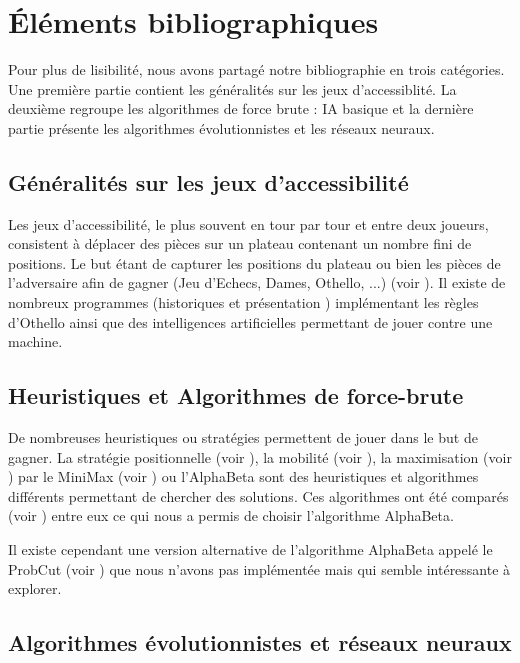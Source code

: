 \section{Éléments bibliographiques} 

\nocite{*}

Pour plus de lisibilité, nous avons partagé notre bibliographie en trois catégories. Une première partie contient les généralités sur les jeux d’accessiblité. La deuxième regroupe les algorithmes de force brute : IA basique et la dernière partie présente les algorithmes évolutionnistes et les réseaux neuraux.




\subsection{Généralités sur les jeux d'accessibilité}

Les jeux d’accessibilité, le plus souvent en tour par tour et entre deux
joueurs, consistent à déplacer des pièces sur un plateau contenant un
nombre fini de positions. Le but étant de capturer les positions du
plateau ou bien les pièces de l'adversaire afin de gagner (Jeu d’Echecs, Dames, Othello, ...) (voir \cite{7}). Il existe de nombreux programmes (historiques \cite{otstory} et présentation \cite{a}) implémentant les règles d'Othello ainsi que des intelligences artificielles permettant de jouer contre une machine.




\subsection{Heuristiques et Algorithmes de force-brute}

De nombreuses heuristiques ou stratégies permettent de jouer dans le but de gagner. La stratégie positionnelle (voir \cite{strategy}), la mobilité (voir \cite{13}), la maximisation (voir \cite{1}) par le MiniMax (voir \cite{2})  ou l'AlphaBeta sont des heuristiques et algorithmes différents permettant de chercher des solutions. Ces algorithmes ont été comparés (voir \cite{11}) entre eux ce qui nous a permis de choisir l'algorithme AlphaBeta.

Il existe cependant une version alternative de l'algorithme AlphaBeta appelé le ProbCut (voir \cite{5a} \cite{5b}) que nous n'avons pas implémentée mais qui semble intéressante à explorer.


\subsection{Algorithmes évolutionnistes et réseaux neuraux}

